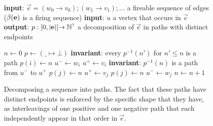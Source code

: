 \begin{proofE}
  \begin{figure}[h!]
    {\small\begin{algorithmic}[0]
      \STATE \textbf{input}: $\vec{e} = (w_0 \to v_0); (w_1 \to v_1); ...$ a fireable sequence of edges (\ie $\beta({\mathbf{e}})$ is a firing sequence)
      \STATE \textbf{input}: $u$ a vertex that occurs in $\vec{e}$
      \STATE \textbf{output}: $p : [0, |\mathbf{e}|[ \to \mathbb{N}^?$ a decomposition of $\vec{e}$ in paths with distinct endpoints
    \end{algorithmic}
    \begin{algorithmic}[1]
      \STATE $n \gets 0$
      \STATE $p \gets (\_ \mapsto \bot)$
        \STATE \textbf{invariant}: every $p^{-1}(n')$ for $n' \leq n$ is a path
         
          \STATE $p(i) \gets n$
          \STATE $u^- \gets w_i$
          \STATE $u^+ \gets v_i$
            \STATE \textbf{invariant}: $p^{-1}(n)$ is a path from $u^-$ to $u^+$
             
               
                \STATE $p(j) \gets n$
                \STATE $u^+ \gets v_j$ 
              \ENDIF
               
                \STATE $p(j) \gets n$
                \STATE $u^- \gets w_j$ 
              \ENDIF
            \ENDIF
          \ENDFOR
          \STATE $n \gets n + 1$ 
        \ENDIF
      \ENDFOR
    \end{algorithmic}}
    \caption{Decomposing a sequence into paths.
      The fact that these paths have distinct endpoints is enforced by the specific shape that they have,
      as interleavings of one positive and one negative path that each independently appear in that order in $\vec{e}$.
    }
    \label{algo:path-decomposition}
  \end{figure}


\end{proofE}
